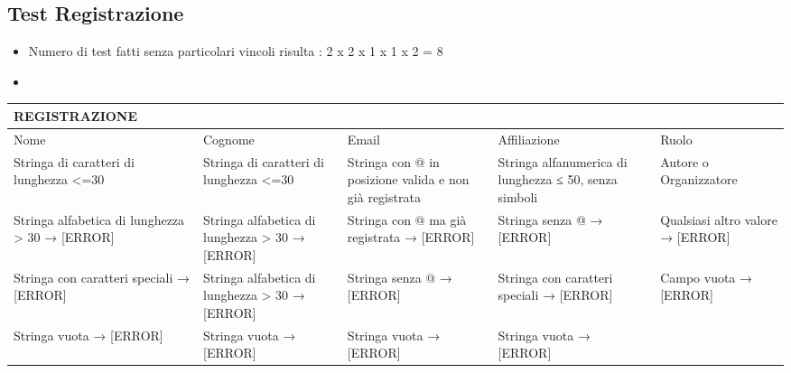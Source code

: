 \subsection{Test Registrazione}
\label{sec:test_registrazione}

\begin{itemize}
\item Numero di test fatti senza particolari vincoli risulta : 2 x 2 x 1 x 1 x 2 = 8
\item
\end{itemize}

\begin{tabular}{|p{3cm}|p{2cm}|p{2cm}|p{2cm}|p{2cm}|}
\hline
\rowcolor{SkyBlue}
REGISTRAZIONE & & & &\\
\hline
Nome & Cognome & Email & Affiliazione & Ruolo  \\
\hline
Stringa di caratteri di lunghezza <=30 & Stringa di caratteri di lunghezza <=30 & Stringa con @ in posizione valida e non già registrata & Stringa alfanumerica di lunghezza ≤ 50, senza simboli & Autore o Organizzatore \\
\hline
Stringa alfabetica di lunghezza > 30 → [ERROR] & Stringa alfabetica di lunghezza > 30 → [ERROR] & Stringa con @ ma già registrata → [ERROR] & Stringa senza @ → [ERROR] & Qualsiasi altro valore → [ERROR] \\
\hline
Stringa con caratteri speciali → [ERROR] & Stringa alfabetica di lunghezza > 30 → [ERROR] & Stringa senza @ → [ERROR] & Stringa con caratteri speciali → [ERROR] & Campo vuota → [ERROR]  \\
\hline
Stringa vuota → [ERROR] & Stringa vuota → [ERROR] & Stringa vuota → [ERROR] & Stringa vuota → [ERROR] &\\
\hline
\end{tabular}



